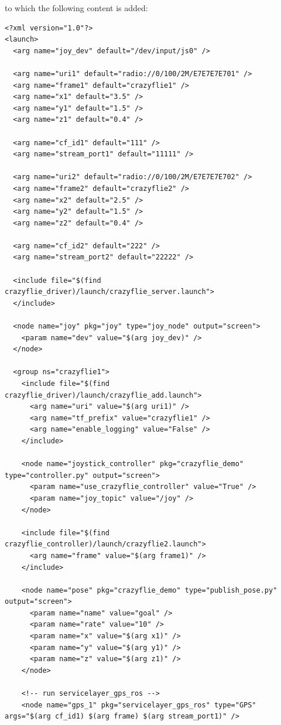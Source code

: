 \noindent to which the following content is added:
\begin{code}
\begin{verbatim}
<?xml version="1.0"?>
<launch>
  <arg name="joy_dev" default="/dev/input/js0" />

  <arg name="uri1" default="radio://0/100/2M/E7E7E7E701" />
  <arg name="frame1" default="crazyflie1" />
  <arg name="x1" default="3.5" />
  <arg name="y1" default="1.5" />
  <arg name="z1" default="0.4" />
  
  <arg name="cf_id1" default="111" />
  <arg name="stream_port1" default="11111" />

  <arg name="uri2" default="radio://0/100/2M/E7E7E7E702" />
  <arg name="frame2" default="crazyflie2" />
  <arg name="x2" default="2.5" />
  <arg name="y2" default="1.5" />
  <arg name="z2" default="0.4" />
  
  <arg name="cf_id2" default="222" />
  <arg name="stream_port2" default="22222" />

  <include file="$(find crazyflie_driver)/launch/crazyflie_server.launch">
  </include>

  <node name="joy" pkg="joy" type="joy_node" output="screen">
    <param name="dev" value="$(arg joy_dev)" />
  </node>

  <group ns="crazyflie1">
    <include file="$(find crazyflie_driver)/launch/crazyflie_add.launch">
      <arg name="uri" value="$(arg uri1)" />
      <arg name="tf_prefix" value="crazyflie1" />
      <arg name="enable_logging" value="False" />
    </include>

    <node name="joystick_controller" pkg="crazyflie_demo" type="controller.py" output="screen">
      <param name="use_crazyflie_controller" value="True" />
      <param name="joy_topic" value="/joy" />
    </node>

    <include file="$(find crazyflie_controller)/launch/crazyflie2.launch">
      <arg name="frame" value="$(arg frame1)" />
    </include>

    <node name="pose" pkg="crazyflie_demo" type="publish_pose.py" output="screen">
      <param name="name" value="goal" />
      <param name="rate" value="10" />
      <param name="x" value="$(arg x1)" />
      <param name="y" value="$(arg y1)" />
      <param name="z" value="$(arg z1)" />
    </node>
    
    <!-- run servicelayer_gps_ros -->
    <node name="gps_1" pkg="servicelayer_gps_ros" type="GPS" args="$(arg cf_id1) $(arg frame) $(arg stream_port1)" />
    

\end{verbatim}
\end{code}
